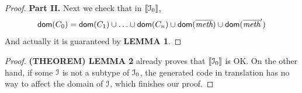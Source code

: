\begin{proof}
\noindent\textbf{Part II.} Next we check that in $[\![{\cal{I}}_0]\!]$, $$\textsf{dom}(C_0)=\textsf{dom}(C_1)\cup\ldots\cup\textsf{dom}(C_n)\cup\textsf{dom}(\overline{\textit{meth}})\cup\textsf{dom}(\overline{\textit{meth}}')$$
And actually it is guaranteed by \textbf{LEMMA 1}.

\end{proof}

\begin{proof}
\textbf{(THEOREM) LEMMA 2} already proves that $[\![{\cal{I}}_0]\!]$ is OK. On the other hand, if some ${\cal{I}}$ is not a subtype of ${\cal{I}}_0$, the generated code in translation has no way to affect the domain of ${\cal{I}}$, which finishes our proof.
\end{proof}








